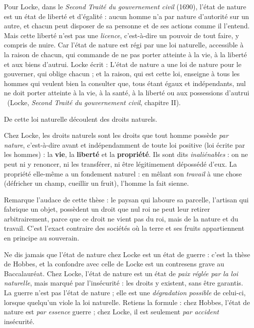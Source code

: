 \documentclass[11pt]{article}
\newcommand{\cle}[1]{{\popxbold\color{popdark}#1}}
\begin{document}
Pour Locke, dans le \emph{Second Traité du gouvernement civil} (1690), l'état de nature est un \cle{état de liberté et d'égalité} : aucun homme n'a par nature d'autorité sur un autre, et chacun peut disposer de sa personne et de ses actions comme il l'entend. Mais cette liberté n'est pas une \emph{licence}, c'est-à-dire un pouvoir de tout faire, y compris de nuire. Car l'état de nature est régi par une \cle{loi naturelle}, accessible à la raison de chacun, qui commande de ne pas porter atteinte à la vie, à la liberté et aux biens d'autrui. Locke écrit : \guillemotleft L'état de nature a une loi de nature pour le gouverner, qui oblige chacun ; et la raison, qui est cette loi, enseigne à tous les hommes qui veulent bien la consulter que, tous étant égaux et indépendants, nul ne doit porter atteinte à la vie, à la santé, à la liberté ou aux possessions d'autrui \guillemotright\ (Locke, \emph{Second Traité du gouvernement civil}, chapitre II).

De cette loi naturelle découlent des \cle{droits naturels}.

\begin{definition}
Chez Locke, les \cle{droits naturels} sont les droits que tout homme possède \emph{par nature}, c'est-à-dire avant et indépendamment de toute loi positive (loi écrite par les hommes) : la \textbf{vie}, la \textbf{liberté} et la \textbf{propriété}. Ils sont dits \emph{inaliénables} : on ne peut ni y renoncer, ni les transférer, ni être légitimement dépossédé d'eux. La propriété elle-même a un fondement naturel : en mêlant son \emph{travail} à une chose (défricher un champ, cueillir un fruit), l'homme la fait sienne.
\end{definition}

Remarque l'audace de cette thèse : le paysan qui laboure sa parcelle, l'artisan qui fabrique un objet, possèdent un droit que nul roi ne peut leur retirer arbitrairement, parce que ce droit ne vient pas du roi, mais de la nature et du travail. C'est l'exact contraire des sociétés où la terre et ses fruits appartiennent en principe au souverain.

\begin{attention}
Ne dis jamais que l'état de nature chez Locke est un état de guerre : c'est la thèse de Hobbes, et la confondre avec celle de Locke est un contresens grave au Baccalauréat. Chez Locke, l'état de nature est un état de \emph{paix réglée par la loi naturelle}, mais marqué par l'\cle{insécurité} : les droits y existent, sans être garantis. La guerre n'est pas l'état de nature ; elle est une \emph{dégradation possible} de celui-ci, lorsque quelqu'un viole la loi naturelle. Retiens la formule : chez Hobbes, l'état de nature est \emph{par essence} guerre ; chez Locke, il est seulement \emph{par accident} insécurité.
\end{attention}
\end{document}
